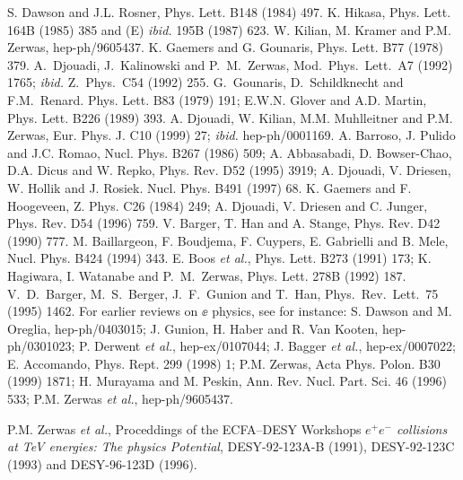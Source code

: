 \begin{thebibliography}{999}
 S. Dawson and J.L. Rosner, Phys. Lett. B148 (1984) 497.
%
 K. Hikasa, Phys. Lett. 164B (1985) 385
and (E) {\it ibid.} 
195B (1987) 623. 
%
 W. Kilian, M. Kramer and P.M. Zerwas, hep-ph/9605437. 
%
 K. Gaemers and G. Gounaris, Phys. Lett. B77 (1978) 379.  
%
 A.~Djouadi, J.~Kalinowski and P.~M.~Zerwas,  
Mod.~Phys.~Lett.~A7 (1992) 1765; 
{\it ibid.} Z.~Phys.~C54 (1992) 255.
%
G.~Gounaris,  D.~Schildknecht and F.M.~Renard. Phys. Lett. B83 (1979) 191; 
E.W.N. Glover and A.D. Martin, Phys. Lett. B226 (1989) 393.  
%
 A. Djouadi, W. Kilian, M.M. Muhlleitner and P.M. Zerwas, 
Eur. Phys. J. C10 (1999) 27; {\it ibid.} hep-ph/0001169. 
%
 A. Barroso, J. Pulido and J.C. Romao, Nucl. Phys. B267 
(1986) 509; A. Abbasabadi, D. Bowser-Chao, D.A. Dicus and W. Repko,
Phys. Rev. D52 (1995) 3919; A. Djouadi, V. Driesen, W. Hollik and J. Rosiek.
Nucl. Phys. B491 (1997) 68. 
%
 K. Gaemers and F. Hoogeveen, Z. Phys. C26 (1984) 249;
A. Djouadi, V. Driesen and C. Junger,  Phys. Rev. D54 (1996) 759. 
%
 V. Barger, T. Han and A. Stange, Phys. Rev. D42 (1990) 777.
%
 M. Baillargeon, F. Boudjema, F. Cuypers, E. Gabrielli and B. 
Mele, Nucl. Phys. B424 (1994) 343.
%
  E. Boos {\it et al.}, Phys. Lett. B273 (1991) 173;
K. Hagiwara, I. Watanabe and P.~M.~Zerwas, Phys. Lett. 278B (1992) 187. 
%
 V.~D.~Barger, M.~S.~Berger, J.~F.~Gunion and T.~Han,
Phys.\ Rev.\ Lett.\  75 (1995) 1462. 
%
 For earlier reviews on $\ee$ physics, see for instance: 
S. Dawson and M. Oreglia, hep-ph/0403015; 
J. Gunion, H. Haber and R. Van Kooten, hep-ph/0301023; 
P. Derwent {\it et al.}, hep-ex/0107044; 
J. Bagger {\it et al.}, hep-ex/0007022; 
E. Accomando, Phys. Rept. 299 (1998) 1;  
P.M. Zerwas, Acta Phys. Polon. B30 (1999) 1871; 
H. Murayama and M. Peskin, Ann. Rev. Nucl. Part. Sci. 46 (1996) 533;  
P.M. Zerwas {\it et al.}, hep-ph/9605437. 

P.M. Zerwas {\it et al.}, Proceddings of the ECFA--DESY Workshops {\it $e^+e^-$ 
collisions at TeV energies: The physics Potential},
DESY-92-123A-B (1991), DESY-92-123C (1993) and DESY-96-123D (1996).   


\end{thebibliography}
